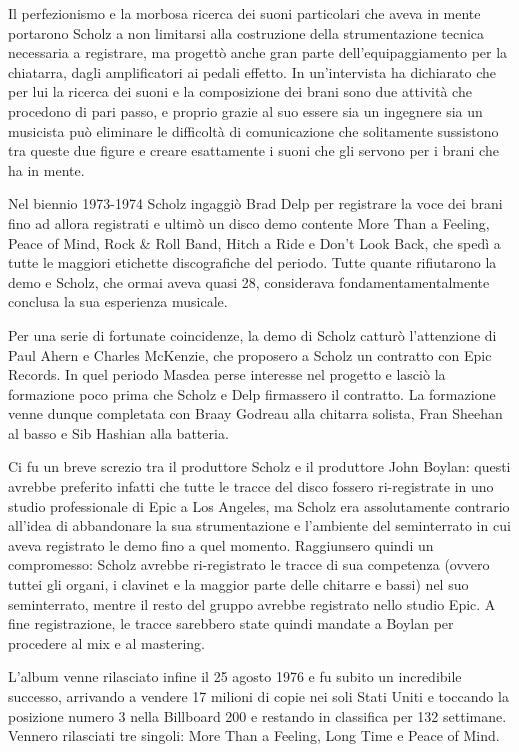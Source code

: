 \documentclass[class=book, crop=false, oneside, 12pt]{standalone}
\begin{document}
Il perfezionismo e la morbosa ricerca dei suoni particolari che aveva in mente portarono Scholz a non limitarsi alla costruzione della strumentazione tecnica necessaria a registrare, ma progettò anche gran parte dell'equipaggiamento per la chiatarra, dagli amplificatori ai pedali effetto. In un'intervista ha dichiarato che per lui la ricerca dei suoni e la composizione dei brani sono due attività che procedono di pari passo, e proprio grazie al suo essere sia un ingegnere sia un musicista può eliminare le difficoltà di comunicazione che solitamente sussistono tra queste due figure e creare esattamente i suoni che gli servono per i brani che ha in mente\cite{yt:scholz_sound}.

Nel biennio 1973-1974 Scholz ingaggiò Brad Delp per registrare la voce dei brani fino ad allora registrati e ultimò un disco demo contente More Than a Feeling, Peace of Mind, Rock \& Roll Band, Hitch a Ride e Don't Look Back, che spedì a tutte le maggiori etichette discografiche del periodo. Tutte quante rifiutarono la demo e Scholz, che ormai aveva quasi 28, considerava fondamentamentalmente conclusa la sua esperienza musicale.

Per una serie di fortunate coincidenze\cite{wiki:bost_a}, la demo di Scholz catturò l'attenzione di Paul Ahern e Charles McKenzie\cite{wiki:bost_b}, che proposero a Scholz un contratto con Epic Records. In quel periodo Masdea perse interesse nel progetto e lasciò la formazione poco prima che Scholz e Delp firmassero il contratto. La formazione venne dunque completata con Braay Godreau alla chitarra solista, Fran Sheehan al basso e Sib Hashian alla batteria.

Ci fu un breve screzio tra il produttore Scholz e il produttore John Boylan: questi avrebbe preferito infatti che tutte le tracce del disco fossero ri-registrate in uno studio professionale di Epic a Los Angeles, ma Scholz era assolutamente contrario all'idea di abbandonare la sua strumentazione e l'ambiente del seminterrato in cui aveva registrato le demo fino a quel momento. Raggiunsero quindi un compromesso: Scholz avrebbe ri-registrato le tracce di sua competenza (ovvero tuttei gli organi, i clavinet e la maggior parte delle chitarre e bassi) nel suo seminterrato, mentre il resto del gruppo avrebbe registrato nello studio Epic. A fine registrazione, le tracce sarebbero state quindi mandate a Boylan per procedere al mix e al mastering.

L'album venne rilasciato infine il 25 agosto 1976 e fu subito un incredibile successo, arrivando a vendere 17 milioni di copie nei soli Stati Uniti e toccando la posizione numero 3 nella Billboard 200 e restando in classifica per 132 settimane\cite{wiki:bost_b}. Vennero rilasciati tre singoli: More Than a Feeling, Long Time e Peace of Mind.
\end{document}
